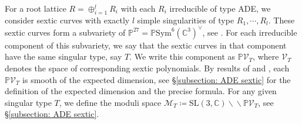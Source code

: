 \documentclass[12pt,reqno,a4paper]{amsart}
\theoremstyle{remark}
\theoremstyle{definition}
\newcommand{\CC}{\mathbb{C}}
\newcommand{\PP}{\mathbb{P}}
\newcommand{\calM}{\mathcal{M}}
\newcommand{\calV}{\mathcal{V}}
\newcommand\SL{\mathrm{SL}}
\newcommand{\bs}{\backslash}
\newcommand{\dbs}{\bs\!\! \bs}
\newcommand{\marg}[1]{\normalsize{{\color{red}\footnote{#1}}}{\marginpar[\vskip -.3cm {\color{red}\hfill\tiny{\thefootnote}\normalsize$\implies$}]{\vskip -.3cm{ \color{red}$\impliedby$\tiny\thefootnote}}}}
\newcommand{\Zhong}[1]{\marg{\color{blue}(Zhong): #1}}
\begin{document}
For a root lattice $R=\oplus_{i=1}^l R_i$ with each $R_i$ irreducible of type ADE, we consider sextic curves with exactly $l$ simple singularities of type $R_1, \cdots, R_l$. These sextic curves form a subvariety of $\PP^{27}=\PP\mathrm{Sym}^6(\CC^3)^\vee$, see \cite[Prop 2.1]{greuel1996equianalytic}. For each irreducible component of this subvariety, we say that the sextic curves in that component have the same singular type, say $T$. We write this component as $\PP\calV_T$, where $\calV_T$ denotes the space of corresponding sextic polynomials.
By results of \cite[Corollary 5.1(b)]{greuel1996equianalytic} and \cite[Theorem 2.5.1]{greuel2021plane}, each $\PP\calV_T$ is smooth of the expected dimension, see \S \ref{subsection: ADE sextic} for the definition of the expected dimension and the precise formula.
For any given singular type $T$, we define the moduli space $\calM_T\coloneqq\SL(3, \CC)\dbs\PP\calV_T$, see \S \ref{subsection: ADE sextic}.

\end{document}
